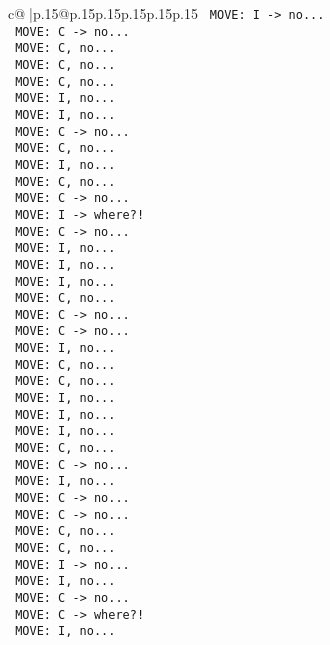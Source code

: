 \documentclass{article}
\begin{document}
{\begin{supertabular}{c@{$\;$}|p{.15\linewidth}@{}p{.15\linewidth}p{.15\linewidth}p{.15\linewidth}p{.15\linewidth}p{.15\linewidth}}
{{{\texttt{ MOVE: I {-}> no...} \\
\texttt{ MOVE: C {-}> no...} \\
\texttt{ MOVE: C, no...} \\
\texttt{ MOVE: C, no...} \\
\texttt{ MOVE: C, no...} \\
\texttt{ MOVE: I, no...} \\
\texttt{ MOVE: I, no...} \\
\texttt{ MOVE: C {-}> no...} \\
\texttt{ MOVE: C, no...} \\
\texttt{ MOVE: I, no...} \\
\texttt{ MOVE: C, no...} \\
\texttt{ MOVE: C {-}> no...} \\
\texttt{ MOVE: I {-}> where?!} \\
\texttt{ MOVE: C {-}> no...} \\
\texttt{ MOVE: I, no...} \\
\texttt{ MOVE: I, no...} \\
\texttt{ MOVE: I, no...} \\
\texttt{ MOVE: C, no...} \\
\texttt{ MOVE: C {-}> no...} \\
\texttt{ MOVE: C {-}> no...} \\
\texttt{ MOVE: I, no...} \\
\texttt{ MOVE: C, no...} \\
\texttt{ MOVE: C, no...} \\
\texttt{ MOVE: I, no...} \\
\texttt{ MOVE: I, no...} \\
\texttt{ MOVE: I, no...} \\
\texttt{ MOVE: C, no...} \\
\texttt{ MOVE: C {-}> no...} \\
\texttt{ MOVE: I, no...} \\
\texttt{ MOVE: C {-}> no...} \\
\texttt{ MOVE: C {-}> no...} \\
\texttt{ MOVE: C, no...} \\
\texttt{ MOVE: C, no...} \\
\texttt{ MOVE: I {-}> no...} \\
\texttt{ MOVE: I, no...} \\
\texttt{ MOVE: C {-}> no...} \\
\texttt{ MOVE: C {-}> where?!} \\
\texttt{ MOVE: I, no...} \\
}}}
\end{supertabular}}
\end{document}
